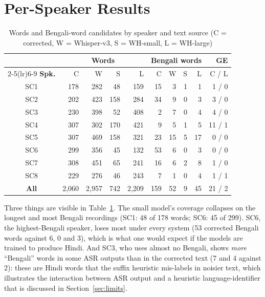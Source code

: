 \documentclass[11pt,a4paper]{report}
\begin{document}
\section{Per-Speaker Results}

\begin{table}[H]
\centering
\caption{Words and Bengali-word candidates by speaker and text source (C = corrected, W = Whisper-v3, S = WH-small, L = WH-large)}
\label{tab:asrspk}
\small
\begin{tabular}{crrrrrrrrr}
\toprule
 & \multicolumn{4}{c}{\textbf{Words}} & \multicolumn{4}{c}{\textbf{Bengali words}} & \textbf{GE} \\
\cmidrule(lr){2-5}\cmidrule(lr){6-9}
\textbf{Spk.} & C & W & S & L & C & W & S & L & C / L \\
\midrule
SC1 & 178 & 282 &  48 & 159 & 15 &  3 & 1 &  1 & 1 / 0 \\
SC2 & 202 & 423 & 158 & 284 & 34 &  9 & 0 &  3 & 3 / 0 \\
SC3 & 230 & 398 &  52 & 408 &  2 &  7 & 0 &  4 & 4 / 0 \\
SC4 & 307 & 302 & 170 & 421 &  9 &  5 & 1 &  5 & 11 / 1 \\
SC5 & 307 & 469 & 158 & 321 & 23 & 15 & 5 & 17 & 0 / 0 \\
SC6 & 299 & 356 &  45 & 132 & 53 &  6 & 0 &  3 & 0 / 0 \\
SC7 & 308 & 451 &  65 & 241 & 16 &  6 & 2 &  8 & 1 / 0 \\
SC8 & 229 & 276 &  46 & 243 &  7 &  1 & 0 &  4 & 1 / 1 \\
\midrule
\textbf{All} & 2,060 & 2,957 & 742 & 2,209 & 159 & 52 & 9 & 45 & 21 / 2 \\
\bottomrule
\end{tabular}
\end{table}

Three things are visible in Table~\ref{tab:asrspk}. The small model's coverage collapses on the longest and most Bengali recordings (SC1: 48 of 178 words; SC6: 45 of 299). SC6, the highest-Bengali speaker, loses most under every system (53 corrected Bengali words against 6, 0 and 3), which is what one would expect if the models are trained to produce Hindi. And SC3, who uses almost no Bengali, shows \emph{more} ``Bengali'' words in some ASR outputs than in the corrected text (7 and 4 against 2): these are Hindi words that the suffix heuristic mis-labels in noisier text, which illustrates the interaction between ASR output and a heuristic language-identifier that is discussed in Section~\ref{sec:limits}.
\end{document}
